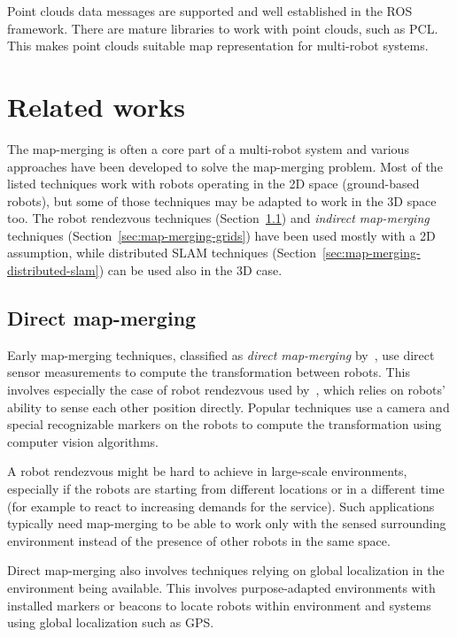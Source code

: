 Point clouds data messages are supported and well established in the \gls{ROS} framework. There are mature libraries to work with point clouds, such as \gls{PCL}. This makes point clouds suitable map representation for multi-robot systems.

\section{Related works}

The map-merging is often a core part of a multi-robot system and various approaches have been developed to solve the map-merging problem. Most of the listed techniques work with robots operating in the \gls{2D} space (ground-based robots), but some of those techniques may be adapted to work in the \gls{3D} space too. The robot rendezvous techniques (Section~\ref{sec:direct-map-merging}) and \textit{indirect map-merging} techniques (Section~\ref{sec:map-merging-grids}) have been used mostly with a \gls{2D} assumption, while distributed \gls{SLAM} techniques (Section~\ref{sec:map-merging-distributed-slam}) can be used also in the \gls{3D} case.

\subsection{Direct map-merging}
\label{sec:direct-map-merging}

Early map-merging techniques, classified as \textit{direct map-merging} by~\citet{lee2012survey}, use direct sensor measurements to compute the transformation between robots. This involves especially the case of robot rendezvous used by~\citet{zhou2006rendezvous}, which relies on robots' ability to sense each other position directly. Popular techniques use a camera and special recognizable markers on the robots to compute the transformation using computer vision algorithms.

A robot rendezvous might be hard to achieve in large-scale environments, especially if the robots are starting from different locations or in a different time (for example to react to increasing demands for the service). Such applications typically need map-merging to be able to work only with the sensed surrounding environment instead of the presence of other robots in the same space.

Direct map-merging also involves techniques relying on global localization in the environment being available. This involves purpose-adapted environments with installed markers or beacons to locate robots within environment and systems using global localization such as \gls{GPS}.

